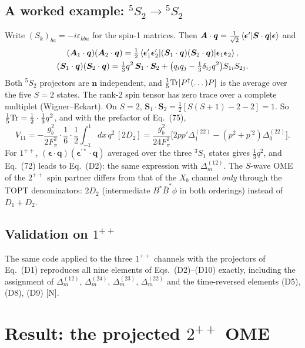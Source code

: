 \documentclass[11pt,a4paper]{article}
\newcommand{\tagD}{\textcolor{orange!85!black}{\textsf{\small[D]}}}
\newcommand{\tagN}{\textcolor{red!70!black}{\textsf{\small[N]}}}
\newcommand{\BstBst}{B^*\bar B^*}
\newcommand{\D}[2]{\Delta^{(#1)}_{#2}}
\newcommand{\vq}{\bm q}
\newcommand{\vn}{\bm n}
\newcommand{\veps}{\bm\epsilon}
\newcommand{\vA}{\bm A}
\begin{document}
\subsection{A worked example: $^5S_2\to{}^5S_2$}

\begin{derbox}[$V_{11}$ with spin operators \tagD]
Write $(S_k)_{ba}=-i\varepsilon_{kba}$ for the spin-1 matrices. Then $\vA\cdot\vq=\frac{1}{\sqrt2}\braket{\veps'|\bm S\cdot\vq|\veps}$ and
\begin{gather*}
(\vA_1\cdot\vq)(\vA_2\cdot\vq)=\tfrac12\braket{\veps_1'\veps_2'|(\bm S_1\cdot\vq)(\bm S_2\cdot\vq)|\veps_1\veps_2},\\
(\bm S_1\cdot\vq)(\bm S_2\cdot\vq)=\tfrac13q^2\,\bm S_1\cdot\bm S_2+\big(q_iq_j-\tfrac13\delta_{ij}q^2\big)S_{1i}S_{2j}.
\end{gather*}
Both $^5S_2$ projectors are $\vn$ independent, and $\frac15{\rm Tr}[P^\dagger(\dots)P]$ is the average over the five $S=2$ states. The rank-2 spin tensor has zero trace over a complete multiplet (Wigner--Eckart). On $S=2$, $\bm S_1\cdot\bm S_2=\frac12[S(S+1)-2-2]=1$. So $\frac15{\rm Tr}=\frac12\cdot\frac13q^2$, and with the prefactor of Eq.~(75),
\[
V_{11}=-\frac{g_b^2}{2F_\pi^2}\cdot\frac16\cdot\frac12\!\int_{-1}^1\!dx\,q^2\,[2D_2]
=\frac{g_b^2}{24F_\pi^2}\Big[2pp'\D{22}{1}-(p^2+p^{\prime2})\D{22}{0}\Big].
\]
For $1^{++}$, $(\veps\cdot\vq)(\veps^{\prime*}\cdot\vq)$ averaged over the three $^3S_1$ states gives $\frac13q^2$, and Eq.~(72) leads to Eq.~(D2): the same expression with $\D{12}{m}$. The $S$-wave OME of the $2^{++}$ spin partner differs from that of the $X_b$ channel \emph{only} through the TOPT denominators: $2D_2$ (intermediate $\BstBst\phi$ in both orderings) instead of $D_1+D_2$.
\end{derbox}

\subsection{Validation on $1^{++}$}

The same code applied to the three $1^{++}$ channels with the projectors of Eq.~(D1) reproduces all nine elements of Eqs.~(D2)--(D10) exactly, including the assignment of $\D{12}{m}$, $\D{24}{m}$, $\D{23}{m}$, $\D{22}{m}$ and the time-reversed elements (D5), (D8), (D9) \tagN.

\section{Result: the projected $2^{++}$ OME}
\label{sec:result}
\end{document}
